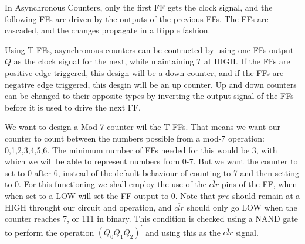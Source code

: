 \documentclass[a4paper,12pt]{article}
\begin{document}
In Asynchronous Counters, only the first FF gets the clock signal, and the following FFs are driven by the outputs of the previous FFs. The FFs are cascaded, and the changes propagate in a Ripple fashion.

Using T FFs, asynchronous counters can be contructed by using one FFs output $Q$ as the clock signal for the next, while maintaining $T$ at HIGH. If the FFs are positive edge triggered, this design will be a down counter, and if the FFs are negative edge triggered, this desgin will be an up counter. Up and down counters can be changed to their opposite types by inverting the output signal of the FFs before it is used to drive the next FF.

We want to design a Mod-7 counter wil the T FFs. That means we want our counter to count between the numbers possible from a mod-7 operation: 0,1,2,3,4,5,6. The minimum number of FFs needed for this would be 3, with which we will be able to represent numbers from 0-7. But we want the counter to set to 0 after 6, instead of the default behaviour of counting to 7 and then setting to 0. For this functioning we shall employ the use of the $\overline{clr}$ pins of the FF, when when set to a LOW will set the FF output to 0. Note that $\overline{pre}$ should remain at a HIGH throught our circuit and operation, and $\overline{clr}$ should only go LOW when the counter reaches 7, or 111 in binary. This condition is checked using a NAND gate to perform the operation $(Q_0Q_1Q_2)^{\prime}$ and using this as the $\overline{clr}$ signal. 
\end{document}
